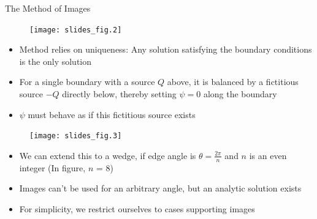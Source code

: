 \documentclass[landscape]{seminar}
\begin{document}
\begin{slide}

\begin{center}

{\color{darkblue} The Method of Images}

\begin{figure}
\texttt{[image: slides\_fig.2]}
\end{figure}
\end{center}

\begin{itemize}
\item Method relies on uniqueness: Any solution satisfying the boundary conditions is the only solution

\item For a single boundary with a source $Q$ above, it is balanced by a fictitious source $-Q$ directly below, thereby setting $\psi = 0$ along the boundary

\item $\psi$ must behave as if this fictitious source exists
\end{itemize}

\end{slide}
\begin{slide}

\begin{center}
\begin{figure}
\texttt{[image: slides\_fig.3]}
\end{figure}
\end{center}

\begin{itemize}
\item We can extend this to a wedge, if edge angle is $\theta = \frac{2\pi}{n}$ and $n$ is an even integer (In figure, $n$ = 8)

\item Images can't be used for an arbitrary angle, but an analytic solution exists

\item For simplicity, we restrict ourselves to cases supporting images
\end{itemize}

\end{slide}
\end{document}
